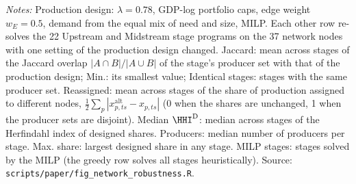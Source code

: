 \begin{table}[htbp]
\begin{threeparttable}
\begin{tablenotes}[flushleft]
\item \emph{Notes:} Production design: $\lambda=0.78$, GDP-log portfolio caps, edge weight $w_E=0.5$, demand from the equal mix of need and size, MILP. Each other row re-solves the 22 Upstream and Midstream stage programs on the 37 network nodes with one setting of the production design changed. Jaccard: mean across stages of the Jaccard overlap $|A\cap B|/|A\cup B|$ of the stage's producer set with that of the production design; Min.: its smallest value; Identical stages: stages with the same producer set. Reassigned: mean across stages of the share of production assigned to different nodes, $\tfrac12\sum_p|x^{\mathrm{alt}}_{p,ts}-x_{p,ts}|$ (0 when the shares are unchanged, 1 when the producer sets are disjoint). Median $\HHI^{\mathrm{D}}$: median across stages of the Herfindahl index of designed shares. Producers: median number of producers per stage. Max. share: largest designed share in any stage. MILP stages: stages solved by the MILP (the greedy row solves all stages heuristically). Source: \texttt{scripts/paper/fig\_network\_robustness.R}.
\end{tablenotes}
\end{threeparttable}
\end{table}
